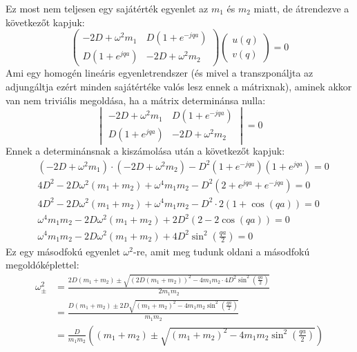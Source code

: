 \documentclass[../main.tex]{subfiles}
\begin{document}
Ez most nem teljesen egy sajátérték egyenlet az $m_1$ és $m_2$ miatt, de átrendezve a következőt kapjuk:
\begin{equation}
    \begin{pmatrix}
        -2 D + \omega^2 m_1 & D(1 + e^{-j q a}) \\
        D(1 + e^{j q a}) & -2 D + \omega^2 m_2
    \end{pmatrix}
    \begin{pmatrix}
        u(q) \\
        v(q)
    \end{pmatrix} = 0
\end{equation}
Ami egy homogén lineáris egyenletrendszer (és mivel a transzponáljta az adjungáltja ezért minden sajátértéke valós lesz ennek a mátrixnak), aminek akkor van nem triviális megoldása, ha a mátrix determinánsa nulla:
\begin{equation}
    \begin{vmatrix}
        -2 D + \omega^2 m_1 & D(1 + e^{-j q a}) \\
        D(1 + e^{j q a}) & -2 D + \omega^2 m_2
    \end{vmatrix} = 0
\end{equation}
Ennek a determinánsnak a kiszámolása után a következőt kapjuk:
\begin{equation}
    \begin{aligned}
        &\left(-2D + \omega^2 m_1\right)\cdot \left(-2D + \omega^2 m_2\right) - D^2 \left(1 + e^{-j q a}\right)\left(1 + e^{j q a}\right) = 0 \\
        &4 D^2 - 2 D \omega^2 (m_1 + m_2) + \omega^4 m_1 m_2 - D^2 \left(2 + e^{j q a} + e^{-j q a}\right) = 0 \\
        &4 D^2 - 2 D \omega^2 (m_1 + m_2) + \omega^4 m_1 m_2 - D^2 \cdot 2 (1 + \cos(q a)) = 0 \\
        &\omega^4 m_1 m_2 - 2 D \omega^2 (m_1 + m_2) + 2 D^2 (2 - 2 \cos(q a)) = 0 \\
        &\omega^4 m_1 m_2 - 2 D \omega^2 (m_1 + m_2) + 4 D^2 \sin^2\left(\frac{q a}{2}\right) = 0
    \end{aligned}
\end{equation}
Ez egy másodfokú egyenlet $\omega^2$-re, amit meg tudunk oldani a másodfokú megoldóképlettel:
\begin{equation}
    \begin{aligned}
        \omega^2_\pm &= \frac{2 D (m_1 + m_2) \pm \sqrt{\left(2 D (m_1 + m_2)\right)^2 - 4 m_1 m_2 \cdot 4 D^2 \sin^2\left(\frac{q a}{2}\right)}}{2 m_1 m_2} \\
        &= \frac{D (m_1 + m_2) \pm 2 D \sqrt{(m_1 + m_2)^2 - 4 m_1 m_2 \sin^2\left(\frac{q a}{2}\right)}}{m_1 m_2} \\
        &= \frac{D}{m_1 m_2} \left( (m_1 + m_2) \pm \sqrt{(m_1 + m_2)^2 - 4 m_1 m_2 \sin^2\left(\frac{q a}{2}\right)} \right)
    \end{aligned}
\end{equation}
\end{document}
